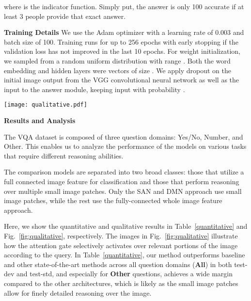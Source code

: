 \documentclass{article}
\begin{document}
where  is the indicator function. Simply put, the answer  is only 100 accurate if at least 3 people provide that exact answer.

\textbf{Training Details}
We use the Adam optimizer \cite{kingma2014adam} with a learning rate of 0.003 and batch size of 100.
Training runs for up to 256 epochs with early stopping if the validation loss has not improved in the last 10 epochs.
For weight initialization, we sampled from a random uniform distribution with range .
Both the word embedding and hidden layers were vectors of size .
We apply dropout on the initial image output from the VGG convolutional neural network \cite{simonyan2014very} as well as the input to the answer module, keeping input with probability .

\begin{figure*}[t!]
   \centering
   	 	\texttt{[image: qualitative.pdf]}
   	 	\vspace{-0.6cm}
   \caption{
   Examples of qualitative results of attention for VQA.
   The original images are shown on the left.
   On the right we show how the attention gate  activates given one pass over the image and query.
   White regions are the most active.
   Answers are given by the DMN+. }
   	 	\vspace{-0.2cm}
   \label{fig:qualitative}
\end{figure*}

\textbf{Results and Analysis}

The VQA dataset is composed of three question domains: Yes/No, Number, and Other.
This enables us to analyze the performance of the models on various tasks that require different reasoning abilities.

The comparison models are separated into two broad classes: those that utilize a full connected image feature for classification and those that perform reasoning over multiple small image patches.
Only the SAN and DMN approach use small image patches, while the rest use the fully-connected whole image feature approach.

Here, we show the quantitative and qualitative results in Table~\ref{quantitative} and Fig.~\ref{fig:qualitative}, respectively.
The images in Fig.~\ref{fig:qualitative} illustrate how the attention gate  selectively activates over relevant portions of the image according to the query.
In Table~\ref{quantitative}, our method outperforms baseline and other state-of-the-art methods across all question domains (\textbf{All}) in both test-dev and test-std, and especially for \textbf{Other} questions,  achieves a wide margin compared to the other architectures, which is likely as the small image patches allow for finely detailed reasoning over the image.
\end{document}
